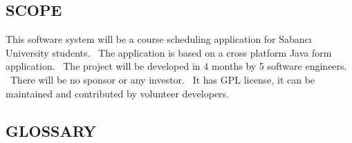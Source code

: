 \documentclass[twoside,letterpaper]{article}
\begin{document}
\subsection[SCOPE]{\rmfamily\bfseries\color{black}
SCOPE}

{\color{black}
\begin{flushleft}
This software system will be a course scheduling application for Sabanc\i{} University students. \ The application is based on a cross platform Java form application. \ The project will be developed in 4 months by 5 software engineers. \ There will be no sponsor or any investor. \ It has GPL license, it can be maintained and contributed by volunteer developers.

\end{flushleft}}

\subsection[GLOSSARY]{\rmfamily\bfseries\color{black}
GLOSSARY}
{\itshape\color{black}}
\end{document}
